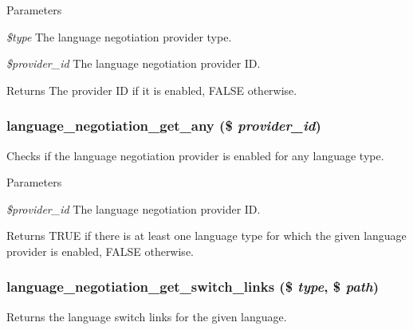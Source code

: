 \begin{DoxyParams}{Parameters}
\item[{\em \$type}]The language negotiation provider type. \item[{\em \$provider\_\-id}]The language negotiation provider ID.\end{DoxyParams}
\begin{DoxyReturn}{Returns}
The provider ID if it is enabled, FALSE otherwise. 
\end{DoxyReturn}
\hypertarget{group__language__negotiation_gadee487a44c0202fa55b74ea1541055d0}{
\subsubsection[{language\_\-negotiation\_\-get\_\-any}]{\setlength{\rightskip}{0pt plus 5cm}language\_\-negotiation\_\-get\_\-any (\$ {\em provider\_\-id})}}
\label{group__language__negotiation_gadee487a44c0202fa55b74ea1541055d0}
Checks if the language negotiation provider is enabled for any language type.


\begin{DoxyParams}{Parameters}
\item[{\em \$provider\_\-id}]The language negotiation provider ID.\end{DoxyParams}
\begin{DoxyReturn}{Returns}
TRUE if there is at least one language type for which the given language provider is enabled, FALSE otherwise. 
\end{DoxyReturn}
\hypertarget{group__language__negotiation_gab97e8b88791a7487449a1a1e4eec871c}{
\subsubsection[{language\_\-negotiation\_\-get\_\-switch\_\-links}]{\setlength{\rightskip}{0pt plus 5cm}language\_\-negotiation\_\-get\_\-switch\_\-links (\$ {\em type}, \/  \$ {\em path})}}
\label{group__language__negotiation_gab97e8b88791a7487449a1a1e4eec871c}
Returns the language switch links for the given language.


